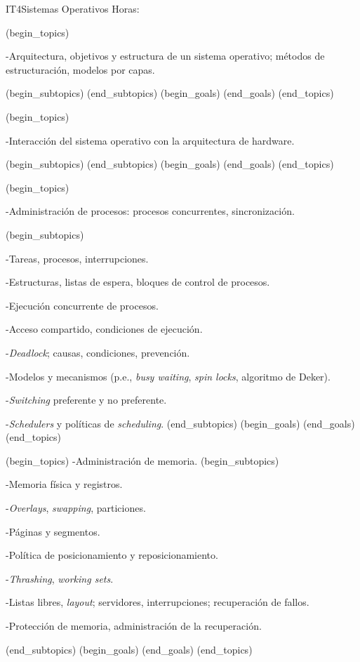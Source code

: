 \begin{BKL2}{IT4}{Sistemas Operativos}
Horas:
 
(begin_topics)

-Arquitectura, objetivos y estructura de un sistema operativo; métodos de estructuración, modelos por capas.

(begin_subtopics)
(end_subtopics)
(begin_goals)
(end_goals)
(end_topics)

 

(begin_topics)

-Interacción del sistema operativo con la arquitectura de hardware.

(begin_subtopics)
(end_subtopics)
(begin_goals)
(end_goals)
(end_topics)

 

(begin_topics)

-Administración de procesos: procesos concurrentes, sincronización.

(begin_subtopics)

-Tareas, procesos, interrupciones.

-Estructuras, listas de espera, bloques de control de procesos.

-Ejecución concurrente de procesos.

-Acceso compartido, condiciones de ejecución.

-{\it Deadlock}; causas, condiciones, prevención.

-Modelos y mecanismos (p.e., {\it busy waiting}, {\it spin locks}, algoritmo de Deker).

-{\it Switching} preferente y no preferente.

-{\it Schedulers} y polí­ticas de {\it scheduling}.
(end_subtopics)
(begin_goals)
(end_goals)
(end_topics)

 

(begin_topics)
-Administración de memoria.
(begin_subtopics)

-Memoria fí­sica y registros.

-{\it Overlays}, {\it swapping}, particiones.

-Páginas y segmentos.

-Polí­tica de posicionamiento y reposicionamiento.

-{\it Thrashing}, {\it working sets}.

-Listas libres, {\it layout}; servidores, interrupciones; recuperación de fallos.

-Protección de memoria, administración de la recuperación.

(end_subtopics)
(begin_goals)
(end_goals)
(end_topics)


\end{BKL2}
